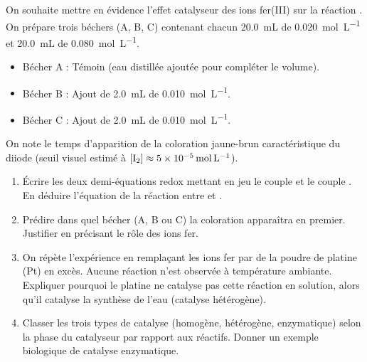 \documentclass[11pt]{article}
\begin{document}
\begin{exercice}
On souhaite mettre en évidence l'effet catalyseur des ions fer(III)  sur la réaction .
On prépare trois béchers (A, B, C) contenant chacun \SI{20,0}{\milli\liter} de  \SI{0,020}{\mol\per\liter} et \SI{20,0}{\milli\liter} de  \SI{0,080}{\mol\per\liter}.
\begin{itemize}
    \item Bécher A : Témoin (eau distillée ajoutée pour compléter le volume).
    \item Bécher B : Ajout de \SI{2,0}{\milli\liter} de  \SI{0,010}{\mol\per\liter}.
    \item Bécher C : Ajout de \SI{2,0}{\milli\liter} de  \SI{0,010}{\mol\per\liter}.
\end{itemize}
On note le temps d'apparition de la coloration jaune-brun caractéristique du diiode (seuil visuel estimé à $[\ce{I2}] \approx \SI{5e-5}{\mol\per\liter}$).
\begin{enumerate}
\item Écrire les deux demi-équations redox mettant en jeu le couple  et le couple . En déduire l'équation de la réaction entre  et .
\item Prédire dans quel bécher (A, B ou C) la coloration apparaîtra en premier. Justifier en précisant le rôle des ions fer.
\item On répète l'expérience en remplaçant les ions fer par de la poudre de platine (Pt) en excès. Aucune réaction n'est observée à température ambiante. Expliquer pourquoi le platine ne catalyse pas cette réaction en solution, alors qu'il catalyse la synthèse de l'eau  (catalyse hétérogène).
\item Classer les trois types de catalyse (homogène, hétérogène, enzymatique) selon la phase du catalyseur par rapport aux réactifs. Donner un exemple biologique de catalyse enzymatique.
\end{enumerate}
\end{exercice}
\end{document}
